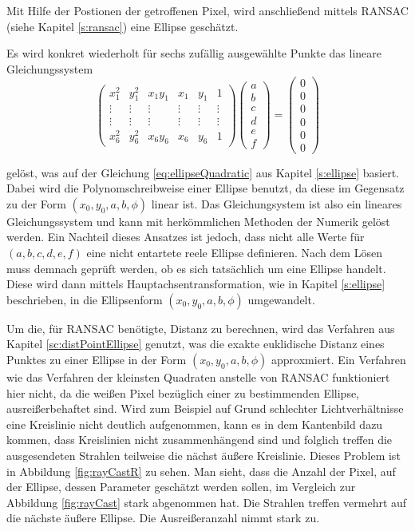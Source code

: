 Mit Hilfe der Postionen der getroffenen Pixel, wird anschließend mittels RANSAC (siehe Kapitel \ref{s:ransac}) eine Ellipse geschätzt.

Es wird konkret wiederholt für sechs zufällig ausgewählte Punkte das lineare Gleichungssystem
\[
\begin{pmatrix}
x_1^2 & y_1^2 & x_1y_1 & x_1 & y_1 & 1\\
\vdots &\vdots & \vdots & \vdots &\vdots & \vdots\\
\vdots &\vdots & \vdots & \vdots &\vdots & \vdots\\
x_6^2 & y_6^2 & x_6y_6 & x_6 & y_6 & 1
\end{pmatrix} \begin{pmatrix}
a \\ b \\ c \\ d \\ e \\ f
\end{pmatrix} = \begin{pmatrix}
0 \\ 0 \\ 0 \\ 0 \\ 0 \\ 0
\end{pmatrix}
\]

gelöst, was auf der Gleichung \ref{eq:ellipseQuadratic} aus Kapitel \ref{s:ellipse} basiert. Dabei wird die Polynomschreibweise einer Ellipse benutzt, da diese im Gegensatz zu der Form $(x_0,y_0,a,b,\phi)$ linear ist. Das Gleichungsystem ist also ein lineares Gleichungssystem und kann mit herkömmlichen Methoden der Numerik gelöst werden. Ein Nachteil dieses Ansatzes ist jedoch, dass nicht alle Werte für $(a,b,c,d,e,f)$ eine nicht entartete reele Ellipse definieren. Nach dem Lösen muss demnach geprüft werden, ob es sich tatsächlich um eine Ellipse handelt.
Diese wird dann mittels Hauptachsentransformation, wie in Kapitel \ref{s:ellipse} beschrieben, in die Ellipsenform $(x_0,y_0,a,b,\phi)$ umgewandelt.

Um die, für RANSAC benötigte, Distanz zu berechnen, wird das Verfahren aus Kapitel \ref{sc:distPointEllipse} genutzt, was die exakte euklidische Distanz eines Punktes zu einer Ellipse in der Form $(x_0,y_0,a,b,\phi)$ approxmiert.
Ein Verfahren wie das Verfahren der kleinsten Quadraten anstelle von RANSAC funktioniert hier nicht, da die weißen Pixel bezüglich einer zu bestimmenden Ellipse, ausreißerbehaftet sind. Wird zum Beispiel auf Grund schlechter Lichtverhältnisse eine Kreislinie nicht deutlich aufgenommen, kann es in dem Kantenbild dazu kommen, dass Kreislinien nicht zusammenhängend sind und folglich treffen die ausgesendeten Strahlen teilweise die nächst äußere Kreislinie. Dieses Problem ist in Abbildung \ref{fig:rayCastR} zu sehen. Man sieht, dass die Anzahl der Pixel, auf der Ellipse, dessen Parameter geschätzt werden sollen, im Vergleich zur Abbildung \ref{fig:rayCast} stark abgenommen hat. Die Strahlen treffen vermehrt auf die nächste äußere Ellipse. Die Ausreißeranzahl nimmt stark zu.

